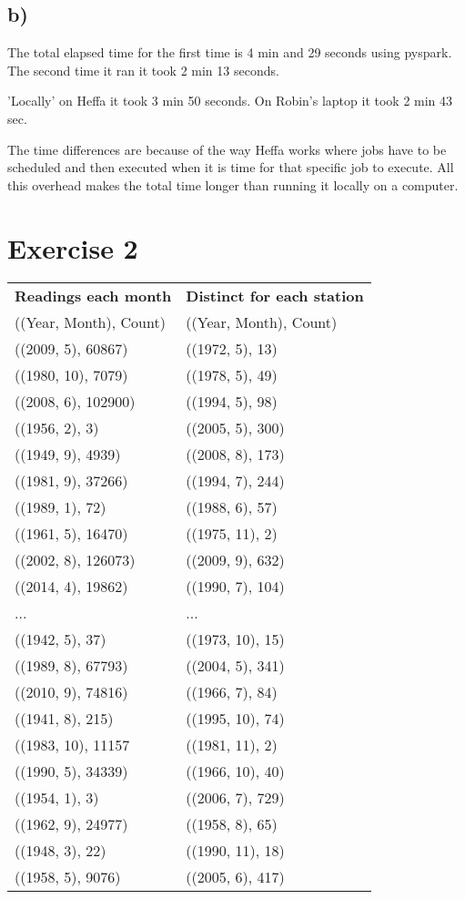 \documentclass[a4paper,titlepage,12pt]{article}
\begin{document}
\subsection{b)}
The total elapsed time for the first time is 4 min and 29 seconds using pyspark.
The second time it ran it took 2 min 13 seconds.

'Locally' on Heffa it took 3 min 50 seconds. On Robin's laptop it took 2 min 43
sec.

The time differences are because of the way Heffa works where jobs have to be
scheduled and then executed when it is time for that specific job to execute.
All this overhead makes the total time longer than running it locally on a
computer.

\section{Exercise 2}
\begin{tabular}{l | l}
\bf Readings each month & \bf Distinct for each station \\ 
((Year, Month), Count) & ((Year, Month), Count) \\
\hline
((2009, 5), 60867) & ((1972, 5), 13)  \\ 
((1980, 10), 7079) & ((1978, 5), 49)  \\ 
((2008, 6), 102900)& ((1994, 5), 98)  \\
((1956, 2), 3)     & ((2005, 5), 300) \\
((1949, 9), 4939)  & ((2008, 8), 173) \\
((1981, 9), 37266) & ((1994, 7), 244) \\
((1989, 1), 72)    & ((1988, 6), 57)  \\
((1961, 5), 16470) & ((1975, 11), 2)  \\
((2002, 8), 126073)& ((2009, 9), 632) \\
((2014, 4), 19862) & ((1990, 7), 104) \\
... & ... \\
((1942, 5), 37)   & ((1973, 10), 15) \\
((1989, 8), 67793)& ((2004, 5), 341) \\
((2010, 9), 74816)& ((1966, 7), 84)  \\
((1941, 8), 215)  & ((1995, 10), 74) \\
((1983, 10), 11157& ((1981, 11), 2)  \\
((1990, 5), 34339)& ((1966, 10), 40) \\
((1954, 1), 3)    & ((2006, 7), 729) \\
((1962, 9), 24977)& ((1958, 8), 65)  \\
((1948, 3), 22)   & ((1990, 11), 18) \\
((1958, 5), 9076) & ((2005, 6), 417) \\
\end{tabular}
\end{document}
